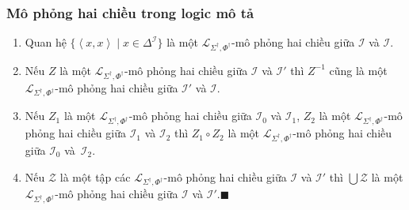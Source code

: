 \documentclass[fleqn]{beamer}
\newcommand{\mL}		{\mathcal{L}}
\newcommand{\mI}		{\mathcal{I}}
\newcommand{\mLSPD}		{\mL_{\Sigma^\dag,\Phi^\dag}}
\newcommand{\myend}		{\mbox{}\hfill\mbox{{\tiny$\!\blacksquare$}}}
\newcommand{\tuple}[1]	{\left\langle#1\right\rangle\!}
\begin{document}
\begin{frame}\frametitle{\bf Mô phỏng hai chiều trong logic mô tả}
	\begin{lemma}
		\begin{enumerate}
			\item Quan hệ $\{\tuple{x,x} \mid x \in \Delta^\mI\}$ là một $\mLSPD$-mô phỏng hai chiều giữa $\mI$ và $\mI$.\label{lm:item1}
			\vspace{1.0ex}
			\item Nếu $Z$ là một $\mLSPD$-mô phỏng hai chiều giữa $\mI$ và $\mI'$ thì $Z^{-1}$ cũng là một $\mLSPD$-mô phỏng hai chiều giữa $\mI'$ và $\mI$.\label{lm:item2}
			\vspace{1.0ex}
			\item Nếu $Z_1$ là một $\mLSPD$-mô phỏng hai chiều giữa $\mI_0$ và $\mI_1$, $Z_2$ là một $\mLSPD$-mô phỏng hai chiều giữa $\mI_1$ và $\mI_2$ thì $Z_1 \circ Z_2$ là một $\mLSPD$-mô phỏng hai chiều giữa $\mI_0$ và~$\mI_2$.\label{lm:item3}
			\vspace{1.0ex}
			\item Nếu $\mathcal{Z}$ là một tập các $\mLSPD$-mô phỏng hai chiều giữa $\mI$ và $\mI'$ thì $\bigcup \mathcal{Z}$ là một $\mLSPD$-mô phỏng hai chiều giữa $\mI$ và $\mI'$.\label{lm:item4}\myend
		\end{enumerate}
	\end{lemma}
\end{frame}
\end{document}
